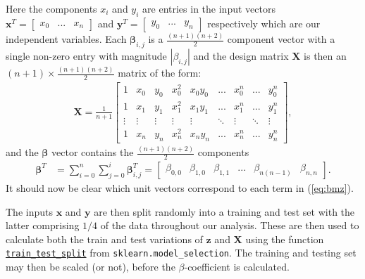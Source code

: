 \documentclass[%
reprint,
amsmath,amssymb,
aps,
pra,
]{revtex4-2}
\begin{document}
Here the components $x_i$ and $y_i$ are entries in the input vectors $\bm x^T=\begin{bmatrix} x_0&...&x_n \end{bmatrix}$ and $\bm y^T=\begin{bmatrix} y_0& ...&y_n \end{bmatrix}$ respectively which are our independent variables. Each $\bm\beta_{i,j}$ is a $\frac{(n+1)(n+2)}{2}$ component vector with a single non-zero entry with magnitude $|\beta_{i,j}|$ and the design matrix $\bm X$ is then an $(n+1)\times\frac{(n+1)(n+2)}{2}$ matrix of the form:
\begin{align}
	\bm X=\frac{1}{n+1}\begin{bmatrix}
		1 & x_0 & y_0 & x^2_0 & x_0y_0 & ... & x_0^n & ... & y_0^n\\
		1 & x_1 & y_1 & x_1^2 & x_1y_1 & ... & x_1^n & ... & y_1^n\\
		\vdots & \vdots & \vdots & \vdots & \vdots & \ddots & \vdots & \ddots & \vdots\\
		1 & x_n & y_n & x_n^2 & x_ny_n & ... & x_n^n & ... & y_n^n
	\end{bmatrix},
\end{align}
and the $\bm\beta$ vector contains the $\frac{(n+1)(n+2)}{2}$ components 
\begin{align*}
	\bm\beta^T&=\sum_{i=0}^n\sum_{j=0}^i\bm\beta_{i,j}^T=\begin{bmatrix}
		\beta_{0,0}&\beta_{1,0}&\beta_{1,1}&...&\beta_{n(n-1)}&\beta_{n,n}
	\end{bmatrix}.
\end{align*}
It should now be clear which unit vectors correspond to each term in (\ref{eq:bmz}).

The inputs $\bm x$ and $\bm y$ are then split randomly into a training and test set with the latter comprising \(1/4\) of the data throughout our analysis. These are then used to calculate both the train and test variations of $\bm z$ and $\bm X$ using the function \href{https://scikit-learn.org/stable/modules/generated/sklearn.model_selection.train_test_split.html}{\texttt{train\_test\_split}} from \texttt{sklearn.model\_selection}. The training and testing set may then be scaled (or not), before the \(\beta\)-coefficient is calculated. 
\end{document}

